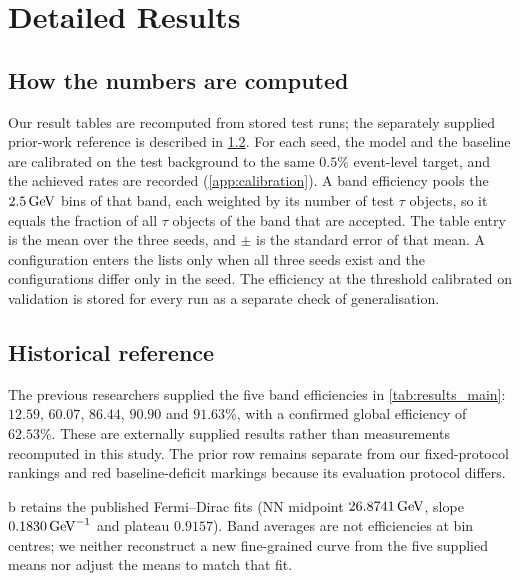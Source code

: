 \section{Detailed Results}
\label{app:results}

\subsection{How the numbers are computed}
\label{app:results_method}
Our result tables are recomputed from stored test runs; the separately supplied prior-work reference is described in \cref{app:prior_reference}. For each seed, the model and the baseline are calibrated on the test background to the same $0.5\%$ event-level target, and the achieved rates are recorded (\cref{app:calibration}). A band efficiency pools the $2.5\,\mathrm{GeV}$ bins of that band, each weighted by its number of test $\tau$ objects, so it equals the fraction of all $\tau$ objects of the band that are accepted. The table entry is the mean over the three seeds, and $\pm$ is the standard error of that mean. A configuration enters the lists only when all three seeds exist and the configurations differ only in the seed. The efficiency at the threshold calibrated on validation is stored for every run as a separate check of generalisation.


\subsection{Historical reference}
\label{app:prior_reference}
The previous researchers supplied the five band efficiencies in \cref{tab:results_main}: $12.59$, $60.07$, $86.44$, $90.90$ and $91.63\%$, with a confirmed global efficiency of $62.53\%$. These are externally supplied results rather than measurements recomputed in this study. The prior row remains separate from our fixed-protocol rankings and red baseline-deficit markings because its evaluation protocol differs.

b retains the published Fermi--Dirac fits (NN midpoint $26.8741\,\mathrm{GeV}$, slope $0.1830\,\mathrm{GeV}^{-1}$ and plateau $0.9157$). Band averages are not efficiencies at bin centres; we neither reconstruct a new fine-grained curve from the five supplied means nor adjust the means to match that fit.

